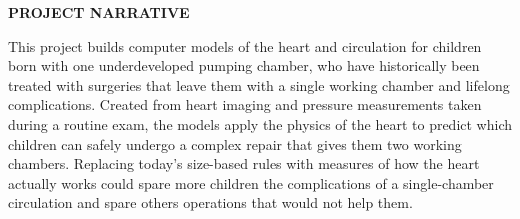 \documentclass[11pt]{article}
\begin{document}
\textbf{PROJECT NARRATIVE}

This project builds computer models of the heart and circulation for children born with one underdeveloped pumping chamber, who have historically been treated with surgeries that leave them with a single working chamber and lifelong complications. Created from heart imaging and pressure measurements taken during a routine exam, the models apply the physics of the heart to predict which children can safely undergo a complex repair that gives them two working chambers. Replacing today's size-based rules with measures of how the heart actually works could spare more children the complications of a single-chamber circulation and spare others operations that would not help them.
\end{document}
